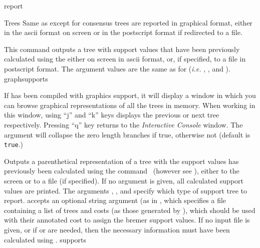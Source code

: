 \begin{command}{report}{}
\begin{arguments}
\begin{argumentgroup}{Trees}
                {Same as  except for consensus trees are
                reported in graphical format, either in the ascii format on
                screen or in the postscript format if redirected to a file.}
                {}

                {This command outputs a tree with support values that have
                been previously calculated using the
                 either on screen
                in ascii format, or, if specified, to a file in postscript
                format. The argument values are the same as for 
                 (\emph{i.e.} ,
                , and ).} 
                {graphsupports}

                {If \poy has been compiled with graphics support, it 
                will display a window in which you can
                browse graphical representations of all the trees in memory.
                When working in this window, using ``j'' and ``k'' keys displays the
                previous or next tree respectively. Pressing ``q'' key 
                returns to the \emph{Interactive Console} window. The argument
                 will collapse the zero length branches if
                true, otherwise not (default is \texttt{true}.)} 
	     {}

                {Outputs a parenthetical representation of a tree with the
                support values has previously been calculated using the
                command~ (however see
                ),
                either to the screen or to a file (if specified). If no argument
                is given, all calculated support values are printed. The arguments
                , , and
                 specify which type of support tree to
                report.  accepts an optional string argument
                (as in , 
                which specifies a file containing a list of trees and costs (as
                those generated by ), which should be used with
                their annotated cost to assign the bremer support values. 
                If no input file is given, or if  or
                 are needed,
                then the necessary information must have been calculated 
                using .}
                {supports}


\end{argumentgroup}
\end{arguments}
\end{command}
